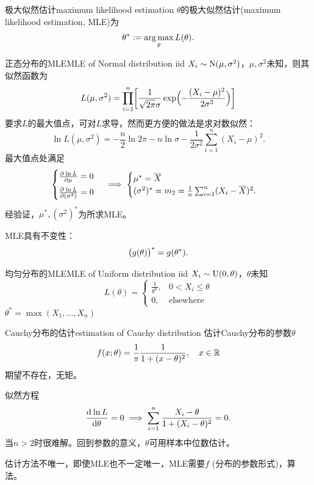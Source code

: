 \begin{definition}{极大似然估计}{maximum likelihood estimation}
	$\theta$的极大似然估计(maximum likelihood estimation, MLE)为
	\begin{equation}
		\theta^\ast := \operatorname*{arg\,max}_\theta L(\theta).
	\end{equation}
\end{definition}
\begin{example}{正态分布的MLE}{MLE of Normal distribution}
	iid $X_i \sim \operatorname{N}(\mu,\sigma^2)$，$\mu,\sigma^2$未知，则其似然函数为
	\[
		L(\mu,\sigma^2) = \prod_{i=1}^n\biggl[\frac1{\sqrt{2\pi}\sigma}\exp\Bigl(-\frac{(X_i - \mu)^2}{2\sigma^2}\Bigr)\biggr]
	\]
	要求$L$的最大值点，可对$L$求导，然而更方便的做法是求对数似然：
	\[
		\ln L(\mu,\sigma^2) = -\frac n2\ln2\pi - n\ln\sigma - \frac1{2\sigma^2}\sum_{i=1}^n(X_i - \mu)^2.
	\]
	最大值点处满足
	\begin{equation}\label{eq:ps-normal-mle}
		\begin{cases}
			\frac{\partial^{}\ln L}{\partial{\mu}^{}} = 0\\[1ex]
			\frac{\partial^{}\ln L}{\partial{(\sigma^2)}^{}} = 0
		\end{cases} \implies
		\begin{cases}
			\mu^\ast = \overline{X}\\
			(\sigma^2)^\ast = m_2 = \frac1n\sum_{i=1}^n(X_i - \overline{X})^2.
		\end{cases}
	\end{equation}
	经验证，$\mu^\ast,(\sigma^2)^\ast$为所求MLE。
\end{example}
\begin{remark}
	MLE具有不变性：
	\begin{equation}
		\bigl(g(\theta)\bigr)^\ast = g(\theta^\ast).
	\end{equation}
\end{remark}
\begin{example}{均匀分布的MLE}{MLE of Uniform distribution}
	iid $X_i \sim \operatorname{U}(0,\theta)$，$\theta$未知
	\[
		L(\theta) = \begin{cases}
			\frac1{\theta^n},&0 < X_i \leqslant \theta\\
			0,&\text{elsewhere}
		\end{cases}
	\]
	$\theta^\ast = \max(X_1,\ldots,X_n)$
\end{example}
\begin{example}{Cauchy分布的估计}{estimation of Cauchy distribution}
	估计Cauchy分布的参数$\theta$
	\[
		f(x;\theta) = \frac1\pi\frac1{1 + (x - \theta)^2},\quad x \in \mathbb{R}
	\]
	期望不存在，无矩。
	
	似然方程
	\[
		\frac{\mathop{}\!\mathrm{d}^{}\ln L}{\mathrm{d}{\theta}^{}} = 0 \implies \sum_{i=1}^n\frac{X_i - \theta}{1 + (X_i - \theta)^2} = 0.
	\]
	当$n > 2$时很难解。回到参数的意义，$\theta$可用样本中位数估计。
\end{example}
估计方法不唯一，即使MLE也不一定唯一，MLE需要$f$ (分布的参数形式)，算法。


